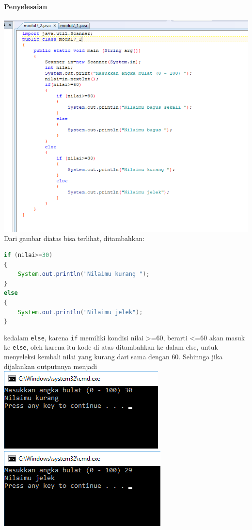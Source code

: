 \documentclass[a4paper,12pt]{article}
\begin{document}
\paragraph{Penyelesaian\\}
\includegraphics[width=\linewidth]{image--004}\\
Dari gambar diatas bisa terlihat, ditambahkan:
\begin{lstlisting}[language=Java]
if (nilai>=30)
{
	System.out.println("Nilaimu kurang ");
}
else
{
	System.out.println("Nilaimu jelek");
}
\end{lstlisting}
kedalam \texttt{else}, karena \texttt{if} memiliki kondisi nilai >=60, berarti <=60 akan masuk ke \texttt{else}, oleh karena itu kode di atas ditambahkan ke dalam else, untuk menyeleksi kembali nilai yang kurang dari sama dengan 60. Sehinnga jika dijalankan outputnnya menjadi\\
\includegraphics[scale=0.6]{image--005}
\includegraphics[scale=0.6]{image--006}
\end{document}
